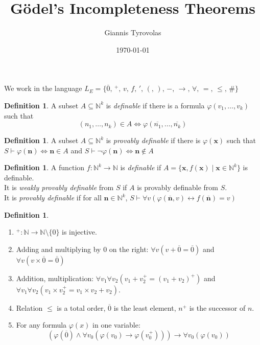 \documentclass[a4paper,10pt]{article}
\title{Gödel's Incompleteness Theorems}
\author{Giannis Tyrovolas}
\date{\today}
\theoremstyle{definition}
\newtheorem{definition}[theorem]{Definition}
\let\vec\mathbf
\let\phi\varphi
\newcommand{\zero}{\overline{0}}
\begin{document}
We work in the language ${L}_E = \{\overline{0}, \,{}^+, \,v,\, f,\, ',\, (,\, ),\, -,\, \rightarrow, \,\forall, \,= ,\, \leqslant, \,\#\}$

\begin{definition}
    A subset $A \subseteq \mathbb{N}^k$ is \emph{definable} if there is a formula $\varphi(v_1, \ldots, v_k)$ such that 
    \[(n_1, \ldots, n_k) \in A \iff \varphi(\overline{n_1}, \ldots, \overline{n_k})\]
\end{definition}

\begin{definition}
    A subset $A \subseteq \mathbb{N}^k$ is \emph{provably definable} if there is $\varphi(\vec{x})$ such that $S \vdash \varphi(\vec{n}) \iff \vec{n} \in A$ and $S \vdash \neg\varphi(\vec{n}) \iff \vec{n} \notin A$ 
\end{definition}

\begin{definition}
    A function $f \colon \mathbb{N}^k \longrightarrow \mathbb{N}$ is \emph{definable} if $A = \{\vec{x}, f(\vec{x}) \mid \vec{x} \in \mathbb{N}^k\}$ is definable.\\
    It is \emph{weakly provably definable} from $S$ if $A$ is provably definable from $S$.\\
    It is \emph{provably definable} if for all $\vec{n} \in \mathbb{N}^k$, $S \vdash \forall v \left(\varphi(\overline{\vec{n}}, v) \leftrightarrow  f(\overline{\vec{n}}) = v\right)$
\end{definition}

\begin{definition}
    \begin{enumerate}
        \item $^{+} \colon \mathbb{N} \longrightarrow \mathbb{N} \setminus \{0\}$ is injective.
        \item Adding and multiplying by 0 on the right: $\forall v \left(v + \zero =\zero \right)$ and $\forall v \left(v \times \zero = \zero\right)$
        \item Addition, multiplication: $ \forall v_1 \forall v_2 (v_1 + v_2^+ = (v_1 + v_2)^+)$ and $\forall v_1 \forall v_2 (v_1 \times v_2^+ = v_1 \times v_2 + v_2)$.
        \item Relation $\leqslant$ is a total order, $\zero$ is the least element, $n^+$ is the successor of $n$.
        \item For any formula $\varphi(x)$ in one variable:
        \[
            (\varphi(\zero) \land \forall v_0(\varphi(v_0) \rightarrow \phi(v_0^+))) \rightarrow \forall v_0 (\phi(v_0))
        \]
    \end{enumerate}
\end{definition}
\end{document}
